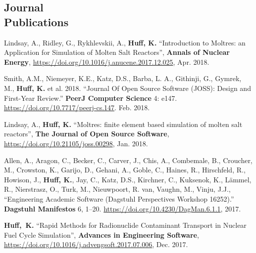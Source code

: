 \documentclass[margin,line]{resume}
\begin{document}
\begin{resume}
    \section{\mysidestyle Journal\\Publications}
      \begin{bibenum}
       \item Lindsay, A., Ridley, G., Rykhlevskii, A., \textbf{Huff, K.} 
               ``Introduction to Moltres: an Application for Simulation of 
               Molten Salt Reactors'',  \textbf{Annals of Nuclear Energy}, 
               \url{https://doi.org/10.1016/j.anucene.2017.12.025}, 
               Apr. 2018.
       \item Smith, A.M., Niemeyer, K.E., Katz, D.S., Barba, L. A., Githinji, 
               G., Gymrek, M., \textbf{Huff, K.} et al. 
              2018. ``Journal Of Open Source Software (JOSS): Design and 
              First-Year Review.'' \textbf{PeerJ Computer Science} 4: e147. 
              \url{https://doi.org/10.7717/peerj-cs.147}. Feb. 2018.
       \item Lindsay, A., \textbf{Huff, K.} 
               ``Moltres: finite element based simulation of molten salt 
               reactors'',  \textbf{The Journal of Open Source Software}, 
               \url{https://doi.org/10.21105/joss.00298}, Jan. 2018.
      \item Allen, A., Aragon, C., Becker, C., Carver, J., Chis, A., Combemale, 
              B., Croucher, M., Crowston, K., Garijo, D., Gehani, A., Goble, 
              C., Haines, R., Hirschfeld, R., Howison, J., \textbf{Huff, K.}, 
              Jay, C., Katz, D.S., Kirchner, C., Kuksenok, K., L\"{a}mmel, R., 
              Nierstrasz, O., Turk, M., Nieuwpoort, R. van, Vaughn, M., Vinju, 
              J.J., ``Engineering Academic Software (Dagstuhl Perspectives 
              Workshop 16252).'' \textbf{Dagstuhl Manifestos} 6, 1–20.  
              \url{https://doi.org/10.4230/DagMan.6.1.1}, 2017. 
       \item \textbf{Huff,~K.} ``Rapid Methods for Radionuclide Contaminant 
               Transport in Nuclear Fuel Cycle Simulation'', \textbf{Advances 
               in Engineering Software}, 
               \url{https://doi.org/10.1016/j.advengsoft.2017.07.006}, Dec. 2017. 

\end{bibenum}
\end{resume}
\end{document}
